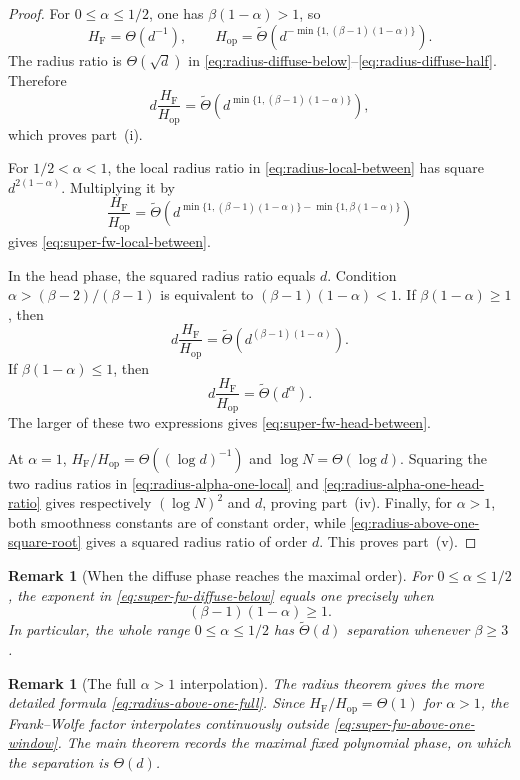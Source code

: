 \documentclass[11pt]{article}
\newtheorem{remark}[theorem]{Remark}
\newcommand{\HF}{H_{\mathrm F}}
\newcommand{\Hop}{H_{\mathrm{op}}}
\begin{document}
\begin{proof}
For $0\leq\alpha\leq1/2$, one has
$\beta(1-\alpha)>1$, so
\[
 \HF=\Theta(d^{-1}),
 \qquad
 \Hop=
 \widetilde\Theta\!\left(
 d^{-\min\{1,(\beta-1)(1-\alpha)\}}
 \right).
\]
The radius ratio is $\Theta(\sqrt d)$ in
\eqref{eq:radius-diffuse-below}--\eqref{eq:radius-diffuse-half}.
Therefore
\[
 d\frac{\HF}{\Hop}
 =
 \widetilde\Theta\!\left(
 d^{\min\{1,(\beta-1)(1-\alpha)\}}
 \right),
\]
which proves part~(i).

For $1/2<\alpha<1$, the local radius ratio in
\eqref{eq:radius-local-between} has square
$d^{2(1-\alpha)}$.  Multiplying it by
\begin{equation}
 \frac{\HF}{\Hop}
 =
 \widetilde\Theta\!\left(
 d^{\min\{1,(\beta-1)(1-\alpha)\}
 -\min\{1,\beta(1-\alpha)\}}
 \right)
 \label{eq:smoothness-ratio-between}
\end{equation}
gives \eqref{eq:super-fw-local-between}.

In the head phase, the squared radius ratio equals $d$.  Condition
$\alpha>(\beta-2)/(\beta-1)$ is equivalent to
$(\beta-1)(1-\alpha)<1$.  If
$\beta(1-\alpha)\geq1$, then
\[
 d\frac{\HF}{\Hop}
 =\widetilde\Theta\!\left(
 d^{(\beta-1)(1-\alpha)}
 \right).
\]
If $\beta(1-\alpha)\leq1$, then
\[
 d\frac{\HF}{\Hop}
 =\widetilde\Theta(d^\alpha).
\]
The larger of these two expressions gives
\eqref{eq:super-fw-head-between}.

At $\alpha=1$,
$\HF/\Hop=\Theta((\log d)^{-1})$ and
$\log N=\Theta(\log d)$.  Squaring the two radius ratios in
\eqref{eq:radius-alpha-one-local} and
\eqref{eq:radius-alpha-one-head-ratio} gives respectively
$(\log N)^2$ and $d$, proving part~(iv).  Finally, for $\alpha>1$,
both smoothness constants are of constant order, while
\eqref{eq:radius-above-one-square-root} gives a squared radius ratio of
order $d$.  This proves part~(v).
\end{proof}

\begin{remark}[When the diffuse phase reaches the maximal order]
For $0\leq\alpha\leq1/2$, the exponent in
\eqref{eq:super-fw-diffuse-below} equals one precisely when
\[
 (\beta-1)(1-\alpha)\geq1.
\]
In particular, the whole range $0\leq\alpha\leq1/2$ has
$\widetilde\Theta(d)$ separation whenever $\beta\geq3$.
\end{remark}

\begin{remark}[The full $\alpha>1$ interpolation]
The radius theorem gives the more detailed formula
\eqref{eq:radius-above-one-full}.  Since $\HF/\Hop=\Theta(1)$ for
$\alpha>1$, the Frank--Wolfe factor interpolates continuously outside
\eqref{eq:super-fw-above-one-window}.  The main theorem records the
maximal fixed polynomial phase, on which the separation is $\Theta(d)$.
\end{remark}
\end{document}
